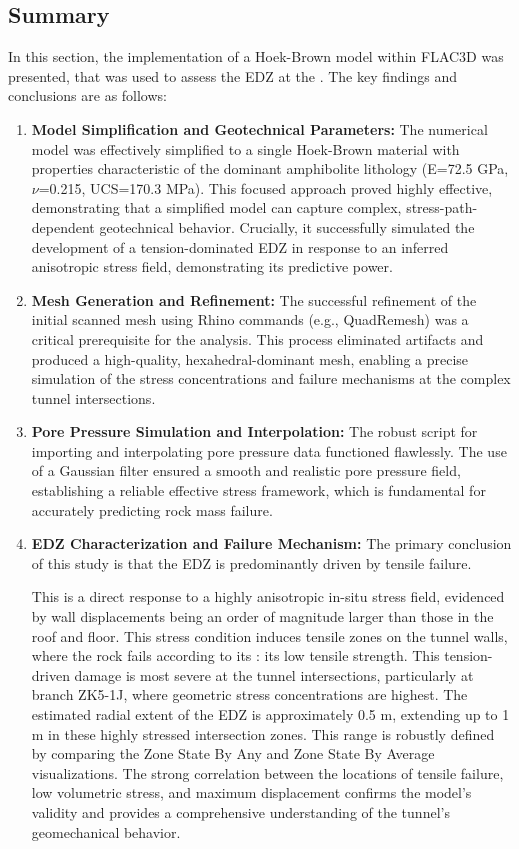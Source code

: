 \subsection{Summary}
In this section, the implementation of a Hoek-Brown model within FLAC3D was presented, that was used to assess the \gls{EDZ} at the \URFBII. The key findings and conclusions are as follows:
\begin{enumerate}
\item \textbf{Model Simplification and Geotechnical Parameters:} The numerical model was effectively simplified to a single Hoek-Brown material with properties characteristic of the dominant amphibolite lithology (E=72.5 GPa, $\nu$=0.215, UCS=170.3 MPa). This focused approach proved highly effective, demonstrating that a simplified model can capture complex, stress-path-dependent geotechnical behavior. Crucially, it successfully simulated the development of a tension-dominated \gls{EDZ} in response to an inferred anisotropic stress field, demonstrating its predictive power.

\item \textbf{Mesh Generation and Refinement:} The successful refinement of the initial scanned mesh using Rhino commands (e.g., QuadRemesh) was a critical prerequisite for the analysis. This process eliminated artifacts and produced a high-quality, hexahedral-dominant mesh, enabling a precise simulation of the stress concentrations and failure mechanisms at the complex tunnel intersections.

\item \textbf{Pore Pressure Simulation and Interpolation:} The robust script for importing and interpolating pore pressure data functioned flawlessly. The use of a Gaussian filter ensured a smooth and realistic pore pressure field, establishing a reliable effective stress framework, which is fundamental for accurately predicting rock mass failure.

\item \textbf{EDZ Characterization and Failure Mechanism:} The primary conclusion of this study is that the \gls{EDZ} is predominantly driven by tensile failure. 
\par This is a direct response to a highly anisotropic in-situ stress field, evidenced by wall displacements being an order of magnitude larger than those in the roof and floor. This stress condition induces tensile zones on the tunnel walls, where the rock fails according to its : its low tensile strength. This tension-driven damage is most severe at the tunnel intersections, particularly at branch ZK5-1J, where geometric stress concentrations are highest. The estimated radial extent of the \gls{EDZ} is approximately 0.5 m, extending up to 1 m in these highly stressed intersection zones. This range is robustly defined by comparing the Zone State By Any and Zone State By Average visualizations. The strong correlation between the locations of tensile failure, low volumetric stress, and maximum displacement confirms the model's validity and provides a comprehensive understanding of the tunnel's geomechanical behavior. \end{enumerate}

